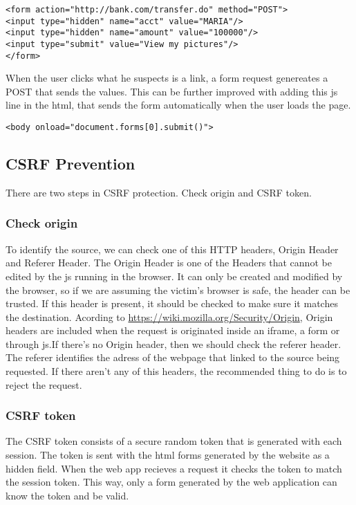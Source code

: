 \begin{lstlisting}[style=verbs]
<form action="http://bank.com/transfer.do" method="POST">
<input type="hidden" name="acct" value="MARIA"/>
<input type="hidden" name="amount" value="100000"/>
<input type="submit" value="View my pictures"/>
</form>
\end{lstlisting}
When the user clicks what he suspects is a link, a form request genereates a POST that sends the values. This can be further improved with adding this js line in the html, that sends the form automatically when the user loads the page.

\begin{lstlisting}[style=verbs]
<body onload="document.forms[0].submit()">
\end{lstlisting}

\subsection{CSRF Prevention}
There are two steps in CSRF protection. Check origin and CSRF token.
\subsubsection{Check 	origin}
To identify the source, we can check one of this HTTP headers, Origin Header and Referer Header.
The Origin Header is one of the Headers that cannot be edited by the js running in the browser. It can only be created and modified by the browser, so if we are assuming the victim's browser is safe, the header can be trusted. If this header is present, it should be checked to make sure it matches the destination. Acording to \url{https://wiki.mozilla.org/Security/Origin}, Origin headers are included when the request is originated inside an iframe, a form or through js.If there's no Origin header, then we should check the referer header. The referer identifies the adress of the webpage that linked to the source being requested. If there aren't any of this headers, the recommended thing to do is to reject the request.
\subsubsection{CSRF token}
The CSRF token consists of a secure random token that is generated with each session. The token is sent with the html forms generated by the website as a hidden field. When the web app recieves a request it checks the token to match the session token. This way, only a form generated by the web application can know the token and be valid.

